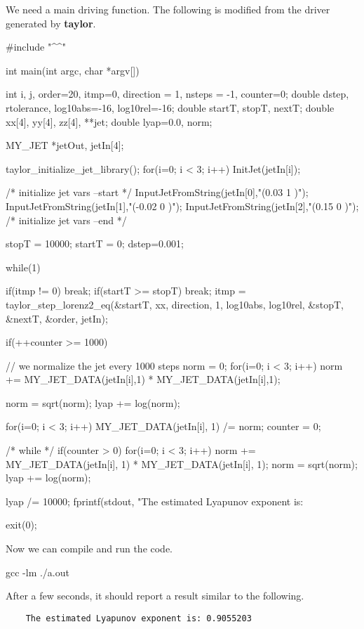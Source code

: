 \documentclass[10pt]{article}
\theoremstyle{remark}
\newcommand{\taylorname}{{\bf taylor}}
\newcommand{\mainfile}{}
\newcommand{\odecfile}{}
\newcommand{\odehfile}{}
\begin{document}
\bigskip
We need a main driving function. The following is modified from the
driver generated by \taylorname{}.
\begin{code}[title={File: \mainfile{}}]
    #include "^\odehfile{}^"
    
    int main(int argc, char *argv[])
    {
      int     i, j, order=20, itmp=0, direction = 1, nsteps = -1, counter=0;
      double  dstep, rtolerance, log10abs=-16, log10rel=-16;
      double  startT, stopT, nextT;
      double  xx[4], yy[4], zz[4], **jet;
      double  lyap=0.0, norm;
    
      MY_JET    *jetOut, jetIn[4];
    
      taylor_initialize_jet_library();
      for(i=0; i < 3; i++) InitJet(jetIn[i]);
      
      /* initialize jet vars --start */
      InputJetFromString(jetIn[0],"(0.03  1 )");
      InputJetFromString(jetIn[1],"(-0.02 0 )");
      InputJetFromString(jetIn[2],"(0.15  0 )");
      /* initialize jet vars --end */
    
      stopT = 10000;
      startT = 0;
      dstep=0.001;
    
      while(1)  {
        if(itmp != 0) {break;}
        if(startT >= stopT) { break;}
        itmp = taylor_step_lorenz2_eq(&startT, xx, direction, 1, 
                                      log10abs, log10rel, 
                                      &stopT, &nextT, &order, jetIn);
    
        if(++counter >= 1000) {  // we normalize the jet every 1000 steps
          norm = 0;
          for(i=0; i < 3; i++)  norm += MY_JET_DATA(jetIn[i],1) * MY_JET_DATA(jetIn[i],1);  
    
          norm = sqrt(norm);
          lyap += log(norm);
    
          for(i=0; i < 3; i++) MY_JET_DATA(jetIn[i], 1) /= norm;
          counter = 0;
        }
      }  /* while */
      if(counter > 0) {
        for(i=0; i < 3; i++) norm += MY_JET_DATA(jetIn[i], 1) *  MY_JET_DATA(jetIn[i], 1); 
        norm = sqrt(norm);
        lyap += log(norm);
      }
    
      lyap /= 10000;
      fprintf(stdout, "The estimated Lyapunov exponent is: %
    
      exit(0);
    }
\end{code}
Now we can compile and run the code.
\begin{command}
    gcc \mainfile{} \odecfile{} -lm
    ./a.out
\end{command}
After a few seconds, it should report a result similar to the
following.
\begin{verbatim}
    The estimated Lyapunov exponent is: 0.9055203
\end{verbatim}%
\end{document}

